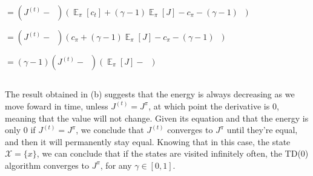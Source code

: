 \documentclass{article}
\DeclareMathOperator{\EX}{\mathbb{E}}%
\DeclareMathOperator{\JPI}{J^\pi} %
\begin{document}
$ = \left(J^{(t)} - \JPI \right) (\EX_\pi[c_t] + (\gamma - 1) \EX_\pi[J] - c_\pi - (\gamma - 1) \JPI)$

$ = \left(J^{(t)} - \JPI \right) (c_\pi +  (\gamma - 1) \EX_\pi[J] - c_\pi - (\gamma - 1) \JPI)$

$ = (\gamma - 1) \left(J^{(t)} - \JPI \right) (\EX_\pi[J] - \JPI)$
\subsection{}

The result obtained in (b) suggests that the energy is always decreasing as we move foward in time, unless $J^{(t)} = J^{\pi}$, 
at which point the derivative is 0, meaning that the value will not change.
Given its equation and that the energy is only 0 if $J^{(t)} = J^{\pi}$, we conclude that $J^{(t)}$ converges to $J^{\pi}$
until they're equal, and then it will permanently stay equal.
Knowing that in this case, the state $\mathcal{X} = \{x\}$, we can conclude that if the states are visited infinitely often, 
the TD(0) algorithm converges to $J^{\pi}$, for any $\gamma \in [0, 1]$.
\end{document}
